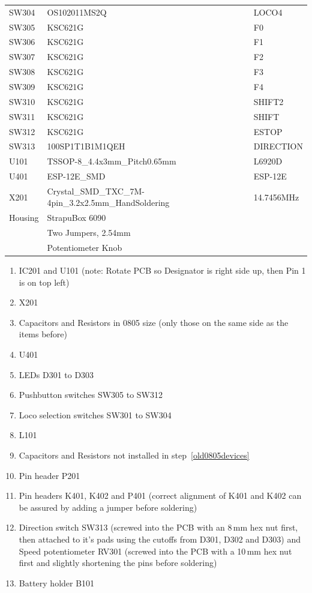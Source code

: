 \documentclass[11pt,a4paper]{scrartcl}
\begin{document}
\begin{table}
\begin{footnotesize}
\begin{tabular}{|m{5em}|l|l|}
    SW304 & OS102011MS2Q & LOCO4 \\
    SW305 & KSC621G & F0 \\
    SW306 & KSC621G & F1 \\
    SW307 & KSC621G & F2 \\
    SW308 & KSC621G & F3 \\
    SW309 & KSC621G & F4 \\
    SW310 & KSC621G & SHIFT2 \\
    SW311 & KSC621G & SHIFT \\
    SW312 & KSC621G & ESTOP \\
    SW313 & 100SP1T1B1M1QEH & DIRECTION \\
    U101 & TSSOP-8\_4.4x3mm\_Pitch0.65mm & L6920D \\
    U401 & ESP-12E\_SMD & ESP-12E \\
    X201 & Crystal\_SMD\_TXC\_7M-4pin\_3.2x2.5mm\_HandSoldering & 14.7456MHz \\
    \hline
    Housing & StrapuBox 6090 & \\
    & Two Jumpers, 2.54mm & \\
    & Potentiometer Knob & \\
    \hline
  \end{tabular}
  \end{footnotesize}
\end{table}

\begin{enumerate}
\item IC201 and U101 (note: Rotate PCB so Designator is right side up, then Pin 1 is on top left)
\item X201
\item Capacitors and Resistors in 0805 size (only those on the same side as the items before) \label{old0805devices}
\item U401
\item LEDs D301 to D303
\item Pushbutton switches SW305 to SW312
\item Loco selection switches SW301 to SW304
\item L101
\item Capacitors and Resistors not installed in step~\ref{old0805devices}
\item Pin header P201
\item Pin headers K401, K402 and P401 (correct alignment of K401 and K402 can be assured by adding a jumper before soldering)
\item Direction switch SW313 (screwed into the PCB with an 8\,mm hex nut first, then attached to it's pads using the cutoffs from D301, D302 and D303) and Speed potentiometer RV301 (screwed into the PCB with a 10\,mm hex nut first and slightly shortening the pins before soldering)
\item Battery holder B101
\end{enumerate}
\end{document}

